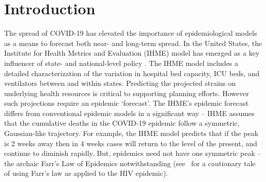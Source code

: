 \section{Introduction}

The spread of COVID-19 has elevated the importance of epidemiological
models as a means to forecast both near- and long-term spread. 
In the United States, the Institute for Health Metrics and Evaluation (IHME)
model has emerged as a key influencer of state- and national-level
policy \citep{covid2020forecasting}.  
The IHME model includes a detailed characterization
of the variation in
hospital bed capacity, ICU beds, and ventilators between and within
states. Predicting the projected strains on underlying
health resources is critical to supporting planning efforts.
However such projections require
an epidemic `forecast'.  The IHME's epidemic forecast
differs from conventional
epidemic models in a significant way -- IHME assumes
that the cumulative deaths in the COVID-19 epidemic 
follow a symmetric, Gaussian-like trajectory. 
For example, the 
IHME model predicts that if the peak is 2 weeks away then in 4 weeks
cases will return to the level of the present, and continue
to diminish rapidly.  But, epidemics need not have one symmetric peak -- 
the archaic Farr's Law of Epidemics notwithstanding
(see~\citep{bregman1990farr} for a cautionary tale of using
Farr's law as applied to the HIV epidemic). 
